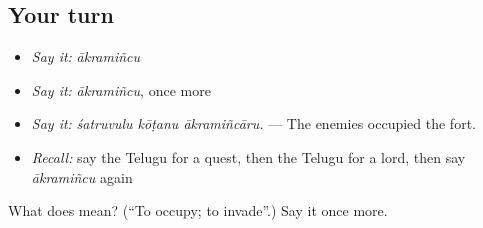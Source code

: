 \subsection*{Your turn}
\begin{itemize}
\raggedright
  \item \emph{Say it:} \emph{ākramiñcu}
  \item \emph{Say it:} \emph{ākramiñcu}, once more
  \item \emph{Say it:} \emph{śatruvulu kōṭanu ākramiñcāru.} — The enemies occupied the fort.
  \item \emph{Recall:} say the Telugu for a quest, then the Telugu for a lord, then say \emph{ākramiñcu} again
\end{itemize}

\begin{tcolorbox}[breakable,colback=teal!4,colframe=teal!35!black,title={Before you move on}]
What does  mean? (\textquotedblleft{}To occupy; to invade\textquotedblright{}.) Say it once more.
\end{tcolorbox}
